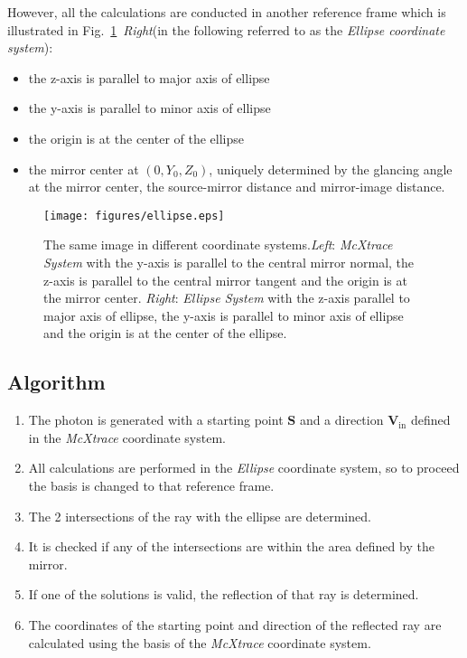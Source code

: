 However, all the calculations are conducted in another reference
frame which is illustrated in Fig.~\ref{fig:Ellipse}~\emph{Right}(in
the following referred to as the \emph{Ellipse coordinate system}):
\begin{itemize}
\item the z-axis is parallel to major axis of ellipse
\item the y-axis is parallel to minor axis of ellipse
\item the origin is at the center of the ellipse
\item the mirror center at $(0,Y_0,Z_0)$, uniquely determined by the
glancing angle at the mirror center, the source-mirror distance and
mirror-image distance.
\end{itemize}

\begin{figure}[htb!]
\centering
\texttt{[image: figures/ellipse.eps]}
 \caption{The same image in different coordinate systems.\newline \emph{Left}:
 \emph{McXtrace System} with the y-axis is parallel to the central mirror normal, the z-axis
 is parallel to the central mirror tangent and the origin is at the mirror
 center. \newline
 \emph{Right}: \emph{Ellipse System} with
the z-axis parallel to major axis of ellipse, the y-axis is parallel
to minor axis of ellipse and the origin is at the center of the
ellipse. }\label{fig:Ellipse}
\end{figure}


\subsection{Algorithm}
\begin{enumerate}
\item The photon is generated with a starting point $\mathbf{S}$ and a direction
$\mathbf{V}_\textrm{in}$ defined in the \emph{McXtrace} coordinate
system.
\item All calculations are performed in the \emph{Ellipse} coordinate system,
so to proceed the basis is changed to that reference frame.
\item The 2 intersections of the ray with the ellipse are determined.
\item It is checked if any of the intersections are within the area
defined by the mirror.
\item If one of the solutions is valid, the reflection of that ray is
determined.
\item The coordinates of the starting point and direction of the
reflected ray are calculated using the basis of the \emph{McXtrace}
coordinate system.
\end{enumerate}


